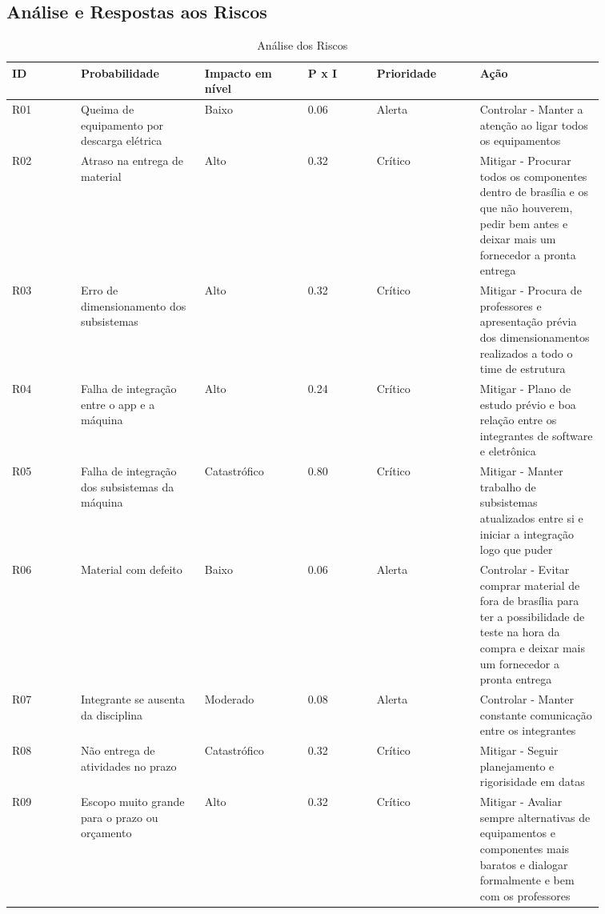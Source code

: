 \begin{apendicesenv}
\newpage
\subsection{Análise e Respostas aos Riscos}
\begin{table}[!htp]
    \centering
    \caption{Análise dos Riscos}
    \label{my-label}
    \begin{tabular}{|p{0.10\linewidth}|p{0.18\linewidth}|p{0.15\linewidth}|p{0.10\linewidth}|p{0.15\linewidth}|p{0.18\linewidth}|}
    \hline
    \textbf{ID} & \textbf{Probabilidade} & \textbf{Impacto em nível} & \textbf{P x I} & \textbf{Prioridade} & \textbf{Ação} \\ \hline
    R01 & Queima de equipamento por descarga elétrica & Baixo & 0.06 & Alerta & Controlar - Manter a atenção ao ligar todos os equipamentos \\ \hline
    R02 & Atraso na entrega de material & Alto & 0.32 & Crítico & Mitigar - Procurar todos os componentes dentro de brasília e os que não houverem, pedir bem antes e deixar mais um fornecedor a pronta entrega \\ \hline
    R03 & Erro de dimensionamento dos subsistemas & Alto & 0.32 & Crítico & Mitigar - Procura de professores e apresentação prévia dos dimensionamentos realizados a todo o time de estrutura \\ \hline
    R04 & Falha de integração entre o app e a máquina & Alto & 0.24 & Crítico & Mitigar - Plano de estudo prévio e boa relação entre os integrantes de software e eletrônica \\ \hline
    R05 & Falha de integração dos subsistemas da máquina & Catastrófico & 0.80 & Crítico & Mitigar - Manter trabalho de subsistemas atualizados entre si e iniciar a integração logo que puder \\ \hline
    R06 & Material com defeito & Baixo & 0.06 & Alerta & Controlar - Evitar comprar material de fora de brasília para ter a possibilidade de teste na hora da compra e deixar mais um fornecedor a pronta entrega \\ \hline
    R07 & Integrante se ausenta da disciplina & Moderado & 0.08 & Alerta & Controlar - Manter constante comunicação entre os integrantes \\ \hline
    R08 & Não entrega de atividades no prazo & Catastrófico & 0.32 & Crítico & Mitigar - Seguir planejamento e rigorisidade em datas \\ \hline
    R09 & Escopo muito grande para o prazo ou orçamento & Alto & 0.32 & Crítico & Mitigar - Avaliar sempre alternativas de equipamentos e componentes mais baratos e dialogar formalmente e bem com os professores \\ \hline

\end{tabular}
\end{table}
\end{apendicesenv}
